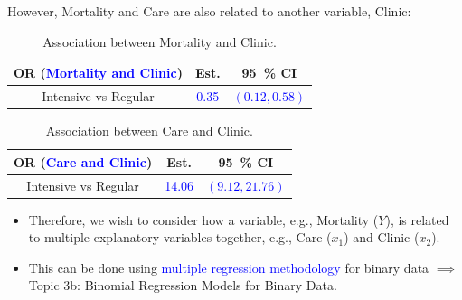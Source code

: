 \documentclass{article}\usepackage[]{graphicx}\usepackage[svgnames]{xcolor}
\begin{document}
However, Mortality and Care are also related to another variable, Clinic:
\begin{table}[!htbp]
      \centering
      \begin{tabular}{ccc}
            OR (\textcolor{Blue}{Mortality and Clinic}) & Est.                   & \qty{95}{\percent} CI             \\
            \midrule
            Intensive vs Regular                        & \textcolor{Blue}{0.35} & \textcolor{Blue}{$ (0.12,0.58) $}
      \end{tabular}
      \caption{Association between Mortality and Clinic.}
\end{table}
\begin{table}[!htbp]
      \centering
      \begin{tabular}{ccc}
            OR (\textcolor{Blue}{Care and Clinic}) & Est.                    & \qty{95}{\percent} CI              \\
            \midrule
            Intensive vs Regular                   & \textcolor{Blue}{14.06} & \textcolor{Blue}{$ (9.12,21.76) $}
      \end{tabular}
      \caption{Association between Care and Clinic.}
\end{table}
\begin{itemize}
      \item Therefore, we wish to consider how a variable, e.g., Mortality ($ Y $), is related to
            multiple explanatory variables together, e.g., Care ($ x_1 $) and Clinic ($ x_2 $).
      \item This can be done using \textcolor{Blue}{multiple regression methodology} for binary data $ \implies $
            Topic 3b: Binomial Regression Models for Binary Data.
\end{itemize}
\end{document}
